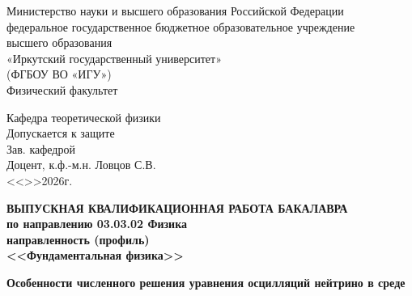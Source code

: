 \documentclass[a4paper,12pt]{article}
\begin{document}
\onehalfspacing
\pagestyle{plain}

\begin{titlepage}
	\begin{center}%
			Министерство науки и высшего образования Российской Федерации\\
		федеральное государственное бюджетное образовательное учреждение\\
		высшего образования \\
		«Иркутский государственный университет»\\
		(ФГБОУ ВО «ИГУ»)\\
		Физический факультет
	\end{center}
	\vspace*{3em}
	
	\begin{flushright}
		\begin{minipage}{92mm}
			Кафедра теоретической физики\\
			Допускается к защите\\
			Зав. кафедрой\\
			Доцент, к.ф.-м.н.\underline{\hspace{30mm}} Ловцов С.В.\\
			\hspace*{40mm}<<\underline{\hspace{8mm}}>>\underline{\hspace{22mm}}2026г.
		\end{minipage}
	\end{flushright}
	\vspace*{4em}
	
	\begin{center}
		\bfseries%
		ВЫПУСКНАЯ КВАЛИФИКАЦИОННАЯ РАБОТА БАКАЛАВРА\\ \bfseries%
		по направлению 03.03.02 Физика\\
		направленность (профиль)\\
		<<Фундаментальная физика>>
	\end{center}
	\vspace*{1em}
	\begin{center}
		\bfseries%
		Особенности численного решения уравнения осцилляций
нейтрино в среде
	\end{center}
	
	\vspace*{3em}
	

\end{titlepage}
\end{document}
